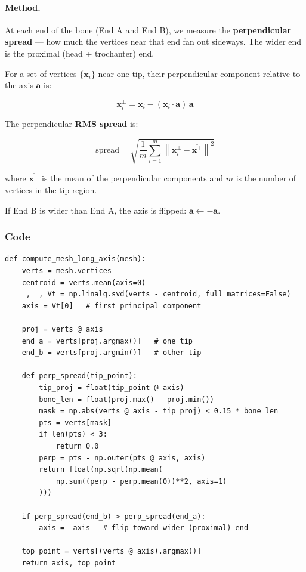 \documentclass[12pt,a4paper]{article}
\begin{document}
\paragraph{Method.}
At each end of the bone (End A and End B), we measure the
\textbf{perpendicular spread} — how much the vertices near that end fan out
sideways.  The wider end is the proximal (head + trochanter) end.

For a set of vertices $\{\mathbf{x}_i\}$ near one tip, their perpendicular
component relative to the axis $\mathbf{a}$ is:

\begin{equation}
    \mathbf{x}_i^{\perp} = \mathbf{x}_i
    - (\mathbf{x}_i \cdot \mathbf{a})\,\mathbf{a}
    \label{eq:perp}
\end{equation}

The perpendicular \textbf{RMS spread} is:

\begin{equation}
    \boxed{
        \text{spread} = \sqrt{
            \frac{1}{m} \sum_{i=1}^{m}
            \left\| \mathbf{x}_i^{\perp} - \overline{\mathbf{x}^{\perp}} \right\|^2
        }
    }
    \label{eq:spread}
\end{equation}

where $\overline{\mathbf{x}^{\perp}}$ is the mean of the perpendicular
components and $m$ is the number of vertices in the tip region.

If End B is wider than End A, the axis is flipped:
$\mathbf{a} \leftarrow -\mathbf{a}$.

\subsubsection{Code}

\begin{lstlisting}
def compute_mesh_long_axis(mesh):
    verts = mesh.vertices
    centroid = verts.mean(axis=0)
    _, _, Vt = np.linalg.svd(verts - centroid, full_matrices=False)
    axis = Vt[0]   # first principal component

    proj = verts @ axis
    end_a = verts[proj.argmax()]   # one tip
    end_b = verts[proj.argmin()]   # other tip

    def perp_spread(tip_point):
        tip_proj = float(tip_point @ axis)
        bone_len = float(proj.max() - proj.min())
        mask = np.abs(verts @ axis - tip_proj) < 0.15 * bone_len
        pts = verts[mask]
        if len(pts) < 3:
            return 0.0
        perp = pts - np.outer(pts @ axis, axis)
        return float(np.sqrt(np.mean(
            np.sum((perp - perp.mean(0))**2, axis=1)
        )))

    if perp_spread(end_b) > perp_spread(end_a):
        axis = -axis   # flip toward wider (proximal) end

    top_point = verts[(verts @ axis).argmax()]
    return axis, top_point
\end{lstlisting}
\end{document}
